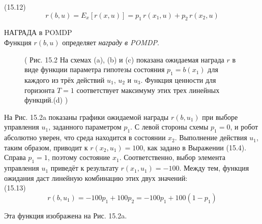 \documentclass[10pt,a4paper]{article}
\begin{document}
(15.12)
$$r(b,u)=E_x[r(x,u)]=p_1\,r(x_1,u)+p_2\,r(x_2,u)$$

НАГРАДА в POMDP\\

Функция $r(b, u)$ определяет \textit{награду в POMDP}. 

\begin{figure}[H]
	\caption{ ( Рис. 15.2 На схемах (a), (b) и (c) показана ожидаемая награда $r$ в виде функции параметра гипотезы состояния $p_1  =  b(x_1)$ для каждого из трёх действий $u_1$, $u_2$ и  $u_3$.  Функция ценности для горизонта $T = 1$ соответствует максимуму этих трех линейных функций.(d) ) }
	\label{fig:152orig}
\end{figure}

На Рис. 15.2a показаны графики ожидаемой награды $r(b, u_1)$ при выборе управления $u_1$, заданного параметром $p_1$. С левой стороны схемы $p_1 = 0$, и робот абсолютно уверен, что среда находится в состоянии $x_2$. Выполнение действия $u_1$, таким образом, приводит к $r(x_2, u_1) = 100$, как задано в Выражении (15.4). Справа $p_1 = 1$, поэтому состояние $x_1$. Соответственно, выбор элемента управления $u_1$ приведёт к результату $r(x_1, u_1) = -100$. Между тем, функция ожидания даст линейную комбинацию этих двух значений:\\

(15.13)
$$r(b,u_1)=-100p_1+100p_2=-100p_1+100(1-p_1)$$

Эта функция изображена на Рис. 15.2a. 
\end{document}
